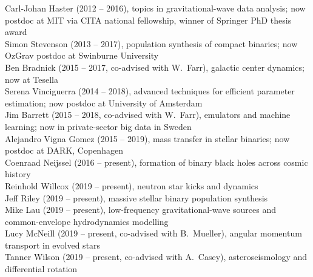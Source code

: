 \documentclass[margin,line]{res}
\begin{document}
\begin{resume}
Carl-Johan Haster (2012 -- 2016), topics in gravitational-wave data analysis; now postdoc at MIT via CITA national fellowship, winner of Springer PhD thesis award\\
Simon Stevenson (2013 -- 2017), population synthesis of compact binaries; now OzGrav postdoc at Swinburne University\\
Ben Bradnick (2015 -- 2017, co-advised with W.~Farr), galactic center dynamics; now at Tesella\\
Serena Vinciguerra (2014 -- 2018), advanced techniques for efficient parameter estimation; now postdoc at University of Amsterdam\\
Jim Barrett (2015 -- 2018, co-advised with W.~Farr), emulators and machine learning; now in private-sector big data in Sweden \\
Alejandro Vigna Gomez (2015 -- 2019), mass transfer in stellar binaries; now postdoc at DARK, Copenhagen\\
Coenraad Neijssel (2016 -- present), formation of binary black holes across cosmic history\\
Reinhold Willcox (2019 -- present), neutron star kicks and dynamics\\
Jeff Riley (2019 -- present), massive stellar binary population synthesis\\
Mike Lau (2019 -- present), low-frequency gravitational-wave sources and common-envelope hydrodynamics modelling\\
Lucy McNeill (2019 -- present, co-advised with B.~Mueller), angular momentum transport in evolved stars\\
Tanner Wilson (2019 -- present, co-advised with A.~Casey), asteroseismology and differential rotation\\


\end{resume}
\end{document}
